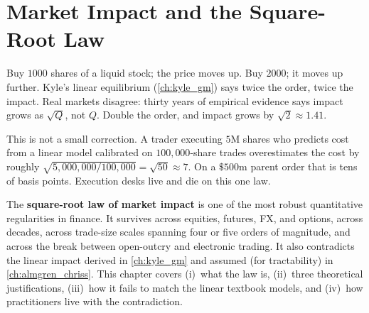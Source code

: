 \chapter{Market Impact and the Square-Root Law}
\label{ch:market_impact}

Buy $1000$ shares of a liquid stock; the price moves up. Buy $2000$;
it moves up further. Kyle's linear equilibrium (\cref{ch:kyle_gm})
says twice the order, twice the impact. Real markets disagree:
thirty years of empirical evidence says impact grows as $\sqrt{Q}$,
not $Q$. Double the order, and impact grows by $\sqrt{2} \approx 1.41$.

This is not a small correction. A trader executing $5$M shares who
predicts cost from a linear model calibrated on $100{,}000$-share
trades overestimates the cost by roughly
$\sqrt{5{,}000{,}000 / 100{,}000} = \sqrt{50} \approx 7$. On a
$\$500$m parent order that is tens of basis points. Execution desks
live and die on this one law.

The \textbf{square-root law of market impact} is one of the most
robust quantitative regularities in finance. It survives across
equities, futures, FX, and options, across decades, across trade-size
scales spanning four or five orders of magnitude, and across the
break between open-outcry and electronic trading. It also contradicts
the linear impact derived in \cref{ch:kyle_gm} and assumed (for
tractability) in \cref{ch:almgren_chriss}. This chapter covers
(i)~what the law is, (ii)~three theoretical justifications,
(iii)~how it fails to match the linear textbook models, and
(iv)~how practitioners live with the contradiction.

